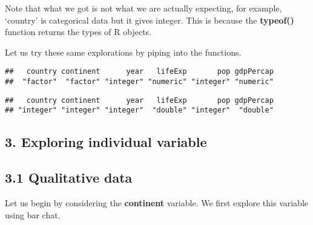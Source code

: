 \documentclass[]{article}
\newenvironment{Shaded}{\begin{snugshade}}{\end{snugshade}}
\newcommand{\KeywordTok}[1]{\textcolor[rgb]{0.13,0.29,0.53}{\textbf{{#1}}}}
\newcommand{\StringTok}[1]{\textcolor[rgb]{0.31,0.60,0.02}{{#1}}}
\newcommand{\CommentTok}[1]{\textcolor[rgb]{0.56,0.35,0.01}{\textit{{#1}}}}
\newcommand{\NormalTok}[1]{{#1}}
\begin{document}
Note that what we got is not what we are actually expecting, for
example, `country' is categorical data but it gives integer. This is
because the \textbf{typeof()} function returns the types of R objects.

Let us try these same explorations by piping into the functions.

\begin{Shaded}
\end{Shaded}

\begin{verbatim}
##   country continent      year   lifeExp       pop gdpPercap 
##  "factor"  "factor" "integer" "numeric" "integer" "numeric"
\end{verbatim}

\begin{Shaded}
\end{Shaded}

\begin{verbatim}
##   country continent      year   lifeExp       pop gdpPercap 
## "integer" "integer" "integer"  "double" "integer"  "double"
\end{verbatim}

\subsection{3. Exploring individual
variable}\label{exploring-individual-variable}

\subsection{3.1 Qualitative data}\label{qualitative-data}

Let us begin by considering the \textbf{continent} variable. We first
explore this variable using bar chat.
\end{document}
